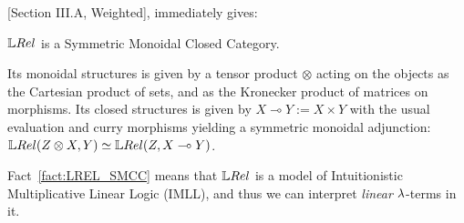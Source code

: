 [Section III.A, Weighted], immediately gives:

\begin{fact}\label{fact:LREL_SMCC}
 $\LREL$ is a Symmetric Monoidal Closed Category.
\end{fact}

Its monoidal structures is given by a tensor product $\otimes$ acting on the objects as the Cartesian product of sets, and as the Kronecker product of matrices on morphisms.
Its closed structures is given by $X\multimap Y:=X\times Y$ with the usual evaluation and curry morphisms yielding a symmetric monoidal adjunction: $\LREL(Z\otimes X, Y) \simeq \LREL (Z, X\multimap Y)$.

Fact~\ref{fact:LREL_SMCC} means that $\LREL$ is a model of Intuitionistic Multiplicative Linear Logic (IMLL), and thus we can interpret \emph{linear} $\lambda$-terms in it.
